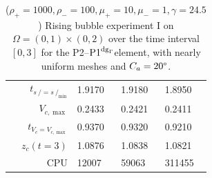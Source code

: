 \documentclass[a4paper,12pt,onecolumn]{article}
\newcommand{\pdg}{${\rm P1}^{{\rm dg}_\Gamma}$} %
\newcommand{\strikes}{\mbox{$s\!\!\!\!\:/$}}
\begin{document}
\begin{table}
\begin{tabular}{rlll}
$t_{\strikes = \strikes_{\min}}$ & 1.9170 & 1.9180 & 1.8950 \\
$V_{c,\max}$                     & 0.2433 & 0.2421 & 0.2411 \\
$t_{V_c = V_{c,\max}}$           & 0.9370 & 0.9320 & 0.9210 \\
$z_c(t=3)$                       & 1.0876 & 1.0838 & 1.0821 \\
CPU                              &  12007 &  59063 & 311455 \\
\hline
\end{tabular}
\hspace*{-3.25cm}
\caption[Navier--Stokes rising bubble I benchmark values P2--\pdg]
{($\rho_+ = 1000,\rho_- = 100,\mu_+ = 10,\mu_- =1,\gamma = 24.5$)
Rising bubble experiment I on $\Omega = (0,1) \times (0,2)$ over the time
interval $[0,3]$ for the P2--\pdg element, with nearly uniform meshes and
$C_a=20\degree$.}
\label{tab:risingbubbleIp2p1dg}
\end{table}
\end{document}
